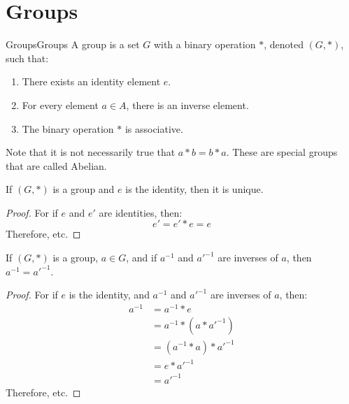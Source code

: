 \section{Groups}
    \begin{fdefinition}{Groups}{Groups}
        A group is a set $G$ with a binary operation $*$,
        denoted $(G,*)$, such that: 
        \begin{enumerate}
            \item There exists an identity element $e$.
            \item For every element $a\in{A}$, there is an inverse element.
            \item The binary operation $*$ is associative.
        \end{enumerate}
    \end{fdefinition}
    Note that it is not necessarily true that $a*b = b*a$.
    These are special groups that are called Abelian.
    \begin{theorem}
        If $(G,*)$ is a group and $e$ is the identity, then it is unique.
    \end{theorem}
    \begin{proof}
        For if $e$ and $e'$ are identities, then:
        \begin{equation}
            e'=e'*e=e
        \end{equation}
        Therefore, etc.
    \end{proof}
    \begin{theorem}
        \label{thm:Group_Theory_Inverses_Are_Unique}
        If $(G,*)$ is a group, $a\in{G}$, and if $a^{-1}$ and
        $a'^{-1}$ are inverses of $a$, then $a^{-1}=a'^{-1}$.
    \end{theorem}
    \begin{proof}
        For if $e$ is the identity, and
        $a^{-1}$ and $a'^{-1}$ are inverses of $a$, then:
        \begin{align}
            a^{-1}&=a^{-1}*e
            \tag{Identitive Property}\\
            &=a^{-1}*(a*a'^{-1})
            \tag{Inverse Property}\\
            &=(a^{-1}*a)*a'^{-1}
            \tag{Associative Property}\\
            &=e*a'^{-1}
            \tag{Inverse Property}\\
            &=a'^{-1}
            \tag{Identitive Property}
        \end{align}
        Therefore, etc.
    \end{proof}
